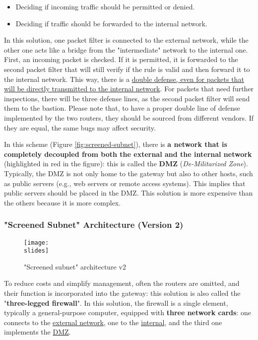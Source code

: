\begin{itemize}
    \item Deciding if incoming traffic should be permitted or denied.
    \item Deciding if traffic should be forwarded to the internal network.
\end{itemize}

In this solution, one packet filter is connected to the external network, while the other one acts like a bridge from the "intermediate" network to the internal one. First, an incoming packet is checked. If it is permitted, it is forwarded to the second packet filter that will still verify if the rule is valid and then forward it to the internal network. This way, there is a \ul{double defense, even for packets that will be directly transmitted to the internal network}. For packets that need further inspections, there will be three defense lines, as the second packet filter will send them to the bastion. Please note that, to have a proper double line of defense implemented by the two routers, they should be sourced from different vendors. If they are equal, the same bugs may affect security.

In this scheme (Figure \ref{fig:screened-subnet}), there is \textbf{a network that is completely decoupled from both the external and the internal network} (highlighted in red in the figure): this is called the \textbf{DMZ} (\textit{De-Militarized Zone}).
Typically, the DMZ is not only home to the gateway but also to other hosts, such as public servers (e.g., web servers or remote access systems). This implies that public servers should be placed in the DMZ. This solution is more expensive than the others because it is more complex.

\subsubsection{"Screened Subnet" Architecture (Version 2)}\label{chap:screened-subnet-v2}

\begin{figure}[h]
    \centering
    \texttt{[image: \\slides]}
    \caption{"Screened subnet" architecture v2}
    \label{fig:screened-subnet-v2}
\end{figure}

To reduce costs and simplify management, often the routers are omitted, and their function is incorporated into the gateway: this solution is also called the "\textbf{three-legged firewall}". In this solution, the firewall is a single element, typically a general-purpose computer, equipped with \textbf{three network cards}: one connects to the \underline{external network}, one to the \underline{internal}, and the third one implements the \underline{DMZ}.

